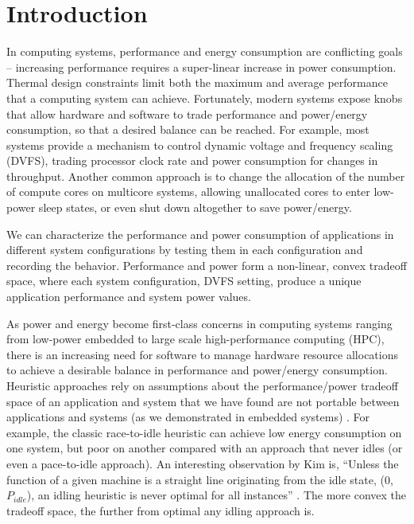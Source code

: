 \section{Introduction}

In computing systems, performance and energy consumption are conflicting goals -- increasing performance requires a super-linear increase in power consumption.
Thermal design constraints limit both the maximum and average performance that a computing system can achieve.
Fortunately, modern systems expose knobs that allow hardware and software to trade performance and power/energy consumption, so that a desired balance can be reached.
For example, most systems provide a mechanism to control dynamic voltage and frequency scaling (DVFS), trading processor clock rate and power consumption for changes in throughput.
Another common approach is to change the allocation of the number of compute cores on multicore systems, allowing unallocated cores to enter low-power sleep states, or even shut down altogether to save power/energy.

We can characterize the performance and power consumption of applications in different system configurations by testing them in each configuration and recording the behavior.
Performance and power form a non-linear, convex tradeoff space, where each system configuration, \eg DVFS setting, produce a unique application performance and system power values.

As power and energy become first-class concerns in computing systems ranging from low-power embedded to large scale high-performance computing (HPC), there is an increasing need for software to manage hardware resource allocations to achieve a desirable balance in performance and power/energy consumption.
Heuristic approaches rely on assumptions about the performance/power tradeoff space of an application and system that we have found are not portable between applications and systems (as we demonstrated in embedded systems) \cite{Imes2014}.
For example, the classic race-to-idle heuristic can achieve low energy consumption on one system, but poor on another compared with an approach that never idles (or even a pace-to-idle approach).
An interesting observation by Kim \etal is, ``Unless the function of a given machine is a straight line originating from the idle state, (0, $P_{idle}$), an idling heuristic is never optimal for all instances'' \cite{kim-cpsna2015}.
The more convex the tradeoff space, the further from optimal any idling approach is.

